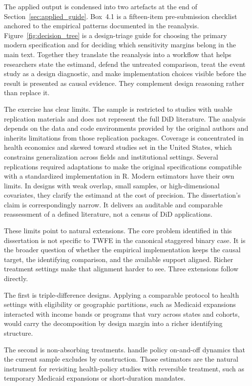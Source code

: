 \documentclass[11pt]{article}
\begin{document}
The applied output is condensed into two artefacts at the end of Section~\ref{sec:applied_guide}. Box~4.1 is a fifteen-item pre-submission checklist anchored to the empirical patterns documented in the reanalysis. Figure~\ref{fig:decision_tree} is a design-triage guide for choosing the primary modern specification and for deciding which sensitivity margins belong in the main text. Together they translate the reanalysis into a workflow that helps researchers state the estimand, defend the untreated comparison, treat the event study as a design diagnostic, and make implementation choices visible before the result is presented as causal evidence. They complement design reasoning rather than replace it.

The exercise has clear limits. The sample is restricted to studies with usable replication materials and does not represent the full DiD literature. The analysis depends on the data and code environments provided by the original authors and inherits limitations from those replication packages. Coverage is concentrated in health economics and skewed toward studies set in the United States, which constrains generalization across fields and institutional settings. Several replications required adaptations to make the original specifications compatible with a standardized implementation in R. Modern estimators have their own limits. In designs with weak overlap, small samples, or high-dimensional covariates, they clarify the estimand at the cost of precision. The dissertation's claim is correspondingly narrow. It delivers an auditable and comparable reassessment of a defined literature, not a census of DiD applications.

These limits point to natural extensions. The core problem identified in this dissertation is not specific to TWFE in the canonical staggered binary case. It is the broader question of whether the empirical implementation keeps the causal target, the identifying comparison, and the available support aligned. Richer treatment settings make that alignment harder to see. Three extensions follow directly.

The first is triple-difference designs. Applying a comparable protocol to health settings with eligibility or geographic partitions, such as Medicaid expansions interacted with income bands or programs that vary across states and cohorts, would carry the decomposition by design margin into a richer identifying structure.

The second is non-absorbing treatments. \textcite{dechaisemartin2020twfe} handle policy on-and-off dynamics that the current sample excludes by construction. Those estimators are the natural instrument for revisiting health-policy studies with reversible treatment, such as temporary Medicaid expansions or short-duration mandates.
\end{document}
